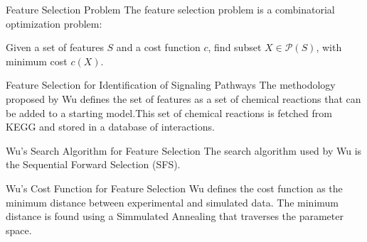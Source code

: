 \documentclass{beamer}
\newcommand{\powerset}{\mathcal{P}}
\begin{document}
\begin{frame}{Feature Selection Problem}
The feature selection problem is a combinatorial optimization problem:
\begin{center}
Given a set of features $S$ and a cost function $c$, find subset 
        $X \in \powerset (S)$, with minimum cost $c(X)$.
\end{center}

\pause
\end{frame}


\begin{frame}{Feature Selection for Identification of Signaling 
Pathways}
The methodology proposed by Wu defines the set of features as a set of 
chemical reactions that can be added to a starting model.\pause This set 
of chemical reactions is fetched from KEGG and stored in a database of
interactions.
\end{frame}


\begin{frame}{Wu's Search Algorithm for Feature Selection}
The search algorithm used by Wu is the Sequential Forward Selection 
(SFS).
\end{frame}


\begin{frame}{Wu's Cost Function for Feature Selection}
Wu defines the cost function as the minimum distance between 
experimental and simulated data. 
\pause
The minimum distance is found using a Simmulated Annealing 
that traverses the parameter space.
\end{frame}


\end{document}
